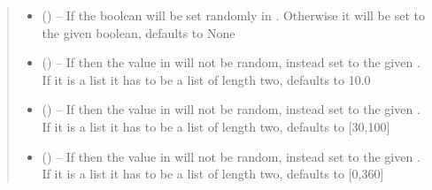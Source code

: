 \documentclass[letterpaper,10pt,english]{sphinxmanual}
\begin{document}
\begin{fulllineitems}
\begin{fulllineitems}
\begin{quote}
\begin{description}
\begin{itemize}
\item {} 
 (\sphinxstyleliteralemphasis{\sphinxupquote{, }}) -- If  the boolean will be set randomly in {\hyperref[\detokenize{index:dataset.dataset_cuboids.create_random_parameters}]{}}. Otherwise it will be set to the given boolean, defaults to None

\item {} 
 (\sphinxstyleliteralemphasis{\sphinxupquote{, }}) -- If  then the value in {\hyperref[\detokenize{index:dataset.dataset_cuboids.create_random_parameters}]{}} will not be random, instead set to the given . If it is a list it has to be a list of length two, defaults to 10.0

\item {} 
 (\sphinxstyleliteralemphasis{\sphinxupquote{, }}) -- If  then the value in {\hyperref[\detokenize{index:dataset.dataset_cuboids.create_random_parameters}]{}} will not be random, instead set to the given . If it is a list it has to be a list of length two, defaults to {[}30,100{]}

\item {} 
 (\sphinxstyleliteralemphasis{\sphinxupquote{, }}) -- If  then the value in {\hyperref[\detokenize{index:dataset.dataset_cuboids.create_random_parameters}]{}} will not be random, instead set to the given . If it is a list it has to be a list of length two, defaults to {[}0,360{]}


\end{itemize}
\end{description}
\end{quote}
\end{fulllineitems}
\end{fulllineitems}
\end{document}
